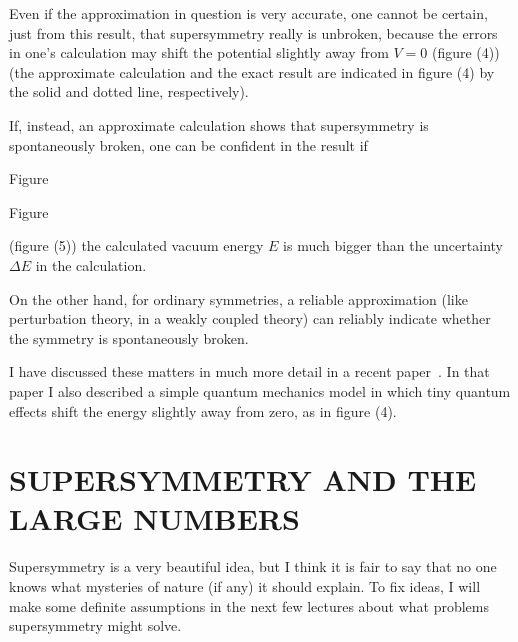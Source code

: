 \documentclass[11pt,a4paper]{article}
\begin{document}
Even if the approximation in question is very accurate, one
cannot be certain, just from this result, that supersymmetry really
is unbroken, because the errors in one's calculation may shift the
potential slightly away from $V = 0$ (figure (4)) (the approximate
calculation and the exact result are indicated in figure (4) by the
solid and dotted line, respectively).

If, instead, an approximate calculation shows that supersymmetry
is spontaneously broken, one can be confident in the result if

\begin{center}
\begin{minipage}{0.42\textwidth}
\centering
{}

\par\smallskip
Figure~\thefigure
\end{minipage}\hfill
\begin{minipage}{0.42\textwidth}
\centering
{}

\par\smallskip
Figure~\thefigure
\end{minipage}
\end{center}

(figure (5)) the calculated vacuum energy $E$ is much bigger than the
uncertainty $\Delta E$ in the calculation.

On the other hand, for ordinary symmetries, a reliable approximation
(like perturbation theory, in a weakly coupled theory) can
reliably indicate whether the symmetry is spontaneously broken.

I have discussed these matters in much more detail in a recent
paper~\cite{ref6}. In that paper I also described a simple quantum mechanics
model in which tiny quantum effects shift the energy slightly away
from zero, as in figure (4).

\section{SUPERSYMMETRY AND THE LARGE NUMBERS}

Supersymmetry is a very beautiful idea, but I think it is fair
to say that no one knows what mysteries of nature (if any) it should
explain. To fix ideas, I will make some definite assumptions in the
next few lectures about what problems supersymmetry might solve.
\end{document}
